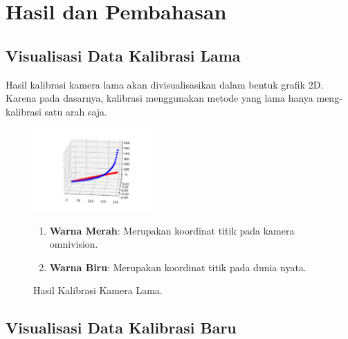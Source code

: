 \section{Hasil dan Pembahasan}
\label{sec:hasildanpembahasan}

\subsection{Visualisasi Data Kalibrasi Lama}
\label{subsec:visualisasidatakalibrasilama} 

Hasil kalibrasi kamera lama akan divisualisasikan dalam bentuk grafik 2D. Karena pada dasarnya, kalibrasi menggunakan metode yang lama hanya meng-kalibrasi satu arah saja. 

\begin{figure}[ht]
    \centering
    \includegraphics[width=0.4\textwidth]{gambar/hasil_1.png}
  
    \caption{Hasil Kalibrasi Kamera Lama.}
    \label{fig:hasilkalibrasilama}
    \begin{enumerate}
      \item \textbf{Warna Merah}: Merupakan koordinat titik pada kamera omnivision. 
      \item \textbf{Warna Biru}: Merupakan koordinat titik pada dunia nyata.
    \end{enumerate}
\end{figure} 

\subsection{Visualisasi Data Kalibrasi Baru}
\label{subsec:visualisasidatakalibrasibaru} 

